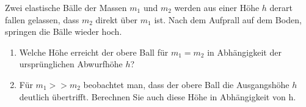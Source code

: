 \begin{ExerciseBlock}
Zwei elastische Bälle der Massen $m_1$ und $m_2$ werden aus einer Höhe $h$ derart fallen gelassen, dass $m_2$ direkt über $m_1$ ist. Nach dem Aufprall auf dem Boden, springen die Bälle wieder hoch.

\begin{enumerate}

	\item Welche Höhe erreicht der obere Ball für $m_1 = m_2$ in Abhängigkeit der ursprünglichen Abwurfhöhe $h$?

	\item Für $m_1 >> m_2$ beobachtet man, dass der obere Ball die Ausgangshöhe $h$ deutlich übertrifft.
Berechnen Sie auch diese Höhe in Abhängigkeit von h.

\end{enumerate}
\end{ExerciseBlock}

